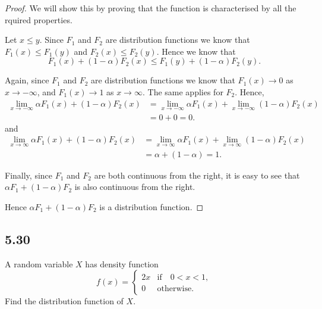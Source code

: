 \documentclass{article}
\begin{document}
\begin{proof}
    We will show this by proving that the function is characterised by all the
    rquired properties.

    Let $x \leq y$. Since $F_1$ and $F_2$ are distribution functions we know that
    $F_1(x) \leq F_1(y)$ and $F_2(x) \leq F_2(y)$. Hence we know that
    $$F_1(x) + (1-\alpha)F_2(x) \leq F_1(y) + (1-\alpha)F_2(y).$$

    Again, since $F_1$ and $F_2$ are distribution functions we know that
    $F_1(x) \rightarrow 0$ as $x \rightarrow -\infty$, and
    $F_1(x) \rightarrow 1$ as $x \rightarrow \infty$. The same applies for $F_2$.
    Hence,
    \begin{align*}
        \lim_{x\rightarrow -\infty} \alpha F_1(x) + (1-\alpha) F_2(x) & =
        \lim_{x\rightarrow -\infty} \alpha F_1(x) + \lim_{x\rightarrow -\infty} (1-\alpha) F_2(x) \\
                                                                      & = 0 + 0 = 0.
    \end{align*}
    and
    \begin{align*}
        \lim_{x\rightarrow \infty} \alpha F_1(x) + (1-\alpha) F_2(x) & =
        \lim_{x\rightarrow \infty} \alpha F_1(x) + \lim_{x\rightarrow \infty} (1-\alpha) F_2(x)     \\
                                                                     & = \alpha + (1 - \alpha) = 1.
    \end{align*}

    Finally, since $F_1$ and $F_2$ are both continuous from the right, it is easy
    to see that $\alpha F_1 + (1-\alpha) F_2$ is also continuous from the right.

    Hence $\alpha F_1 + (1-\alpha) F_2$ is a distribution function.
\end{proof}

\subsection*{5.30} %
A random variable $X$ has density function
\begin{equation*}
    f(x) = \begin{cases}
        2x & \text{if} \quad  0 < x < 1, \\
        0  & \text{otherwise}.
    \end{cases}
\end{equation*}
Find the distribution function of $X$.
\end{document}
